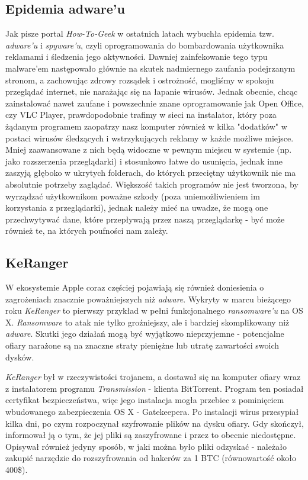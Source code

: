 \documentclass[polish]{kbk}
\begin{document}
\subsection{Epidemia adware'u \cite{adware}}
Jak pisze portal \textit{How-To-Geek} w ostatnich latach wybuchła epidemia tzw. \textit{adware'u} i \textit{spyware'u}, czyli oprogramowania do bombardowania użytkownika reklamami i śledzenia jego aktywności. Dawniej zainfekowanie tego typu malware'em następowało głównie na skutek nadmiernego zaufania podejrzanym stronom, a zachowując zdrowy rozsądek i ostrożność, mogliśmy w spokoju przeglądać internet, nie narażając się na łapanie wirusów. Jednak obecnie, chcąc zainstalować nawet zaufane i powszechnie znane oprogramowanie jak Open Office, czy VLC Player, prawdopodobnie trafimy w sieci na instalator, który poza żądanym programem zaopatrzy nasz komputer również w kilka "dodatków" w postaci wirusów śledzących i wstrzykujących reklamy w każde możliwe miejsce. Mniej zaawansowane z nich będą widoczne w pewnym miejscu w systemie (np. jako rozszerzenia przeglądarki) i stosunkowo łatwe do usunięcia, jednak inne zaszyją głęboko w ukrytych folderach, do których przeciętny użytkownik nie ma absolutnie potrzeby zaglądać. Większość takich programów nie jest tworzona, by wyrządzać użytkownikom poważne szkody (poza uniemożliwieniem im korzystania z przeglądarki), jednak należy mieć na uwadze, że mogą one przechwytywać dane, które przepływają przez naszą przeglądarkę - być może również te, na których poufności nam zależy.

\subsection{KeRanger \cite{keranger}}
W ekosystemie Apple coraz częściej pojawiają się również doniesienia o zagrożeniach znacznie poważniejszych niż \textit{adware}. Wykryty w marcu bieżącego roku \textit{KeRanger} to pierwszy przykład w pełni funkcjonalnego \textit{ransomware'u} na OS X. \textit{Ransomware} to atak nie tylko groźniejszy, ale i bardziej skomplikowany niż \textit{adware}. Skutki jego działań mogą być wyjątkowo nieprzyjemne - potencjalne ofiary narażone są na znaczne straty pieniężne lub utratę zawartości swoich dysków.

\textit{KeRanger} był w rzeczywistości trojanem, a dostawał się na komputer ofiary wraz z instalatorem programu \textit{Transmission} - klienta BitTorrent. Program ten posiadał certyfikat bezpieczeństwa, więc jego instalacja mogła przebiec z pominięciem wbudowanego zabezpieczenia OS X - Gatekeepera. Po instalacji wirus przesypiał kilka dni, po czym rozpoczynał szyfrowanie plików na dysku ofiary. Gdy skończył, informował ją o tym, że jej pliki są zaszyfrowane i przez to obecnie niedostępne. Opisywał również jedyny sposób, w jaki można było pliki odzyskać - należało zakupić narzędzie do rozszyfrowania od hakerów za 1 BTC (równowartość około 400\$). 
\end{document}
